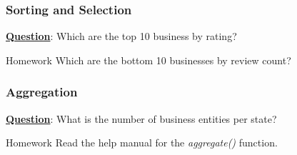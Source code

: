 \subsubsection{Sorting and Selection}
\noindent \textbf{\underline{Question}}: Which are the top 10 business by rating? 
\begin{knitrout}
\color{fgcolor}\begin{kframe}
\begin{alltt}
\hlstd{(business[}\hlopt{$}
                     \hlstd{=} 
                    \hlstd{),}
              \hlstd{(}\hlstd{,}\hlstd{,}\hlstd{)}
              \hlstd{],}
     \hlstd{=}\hlstd{)}
\end{alltt}
\end{kframe}
\end{knitrout}

\begin{DIY}{Homework}
\noindent Which are the bottom 10 businesses by review count?
\end{DIY}

\subsubsection{Aggregation}
\noindent \textbf{\underline{Question}}: What is the number of business entities per state? 
\begin{knitrout}
\color{fgcolor}\begin{kframe}
\begin{alltt}
 \hlkwb{<-} \hlopt{$}
                           \hlstd{=}\hlopt{$}
                           \hlstd{)}
\hlkwb{<-}\hlstd{(}\hlstd{,}\hlstd{)}
\end{alltt}
\end{kframe}
\end{knitrout}


\begin{DIY}{Homework}
\noindent Read the help manual for the \emph{aggregate()} function.
\end{DIY}

